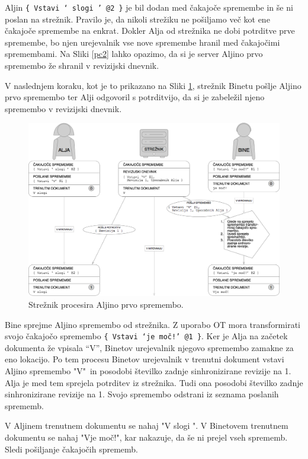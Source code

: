 \documentclass[a4paper, 12pt, twoside]{book}
\begin{document}
Aljin {\tt \{ Vstavi ‘ slogi ’ @2 \}} je bil dodan med čakajoče spremembe in še ni poslan na strežnik. Pravilo je, da nikoli strežiku ne pošiljamo več kot ene čakajoče spremembe na enkrat. Dokler Alja od strežnika ne dobi potrditve prve spremembe, bo njen urejevalnik vse nove spremembe hranil med čakajočimi spremembami. Na Sliki \ref{pc2} lahko opazimo, da si je server Aljino prvo spremembo že shranil v revizijski dnevnik.

\pagebreak

V naslednjem koraku, kot je to prikazano na Sliki \ref{pc3}, strežnik Binetu pošlje Aljino prvo spremembo ter Alji odgovoril s potrditvijo, da si je zabeležil njeno spremembo v revizijski dnevnik.

\begin{figure}[placement h]
\begin{center}
\includegraphics[width=14cm]{pc3.png}
\end{center}
\caption{Strežnik procesira Aljino prvo spremembo.}
\label{pc3}
\end{figure}

Bine sprejme Aljino spremembo od strežnika. Z uporabo OT mora transformirati svojo čakajočo spremembo {\tt \{ Vstavi ‘je moč!’ @1 \}}. Ker je Alja na začetek dokumenta že vpisala “V”, Binetov urejevalnik njegovo spremembo zamakne za eno lokacijo. Po tem procesu Binetov urejevalnik v trenutni dokument vstavi Aljino spremembo "V"\ in posodobi številko zadnje sinhronizirane revizije na 1. Alja je med tem sprejela potrditev iz strežnika. Tudi ona posodobi številko zadnje sinhronizirane revizije na 1. Svojo spremembo odstrani iz seznama poslanih sprememb.

V Aljinem trenutnem dokumentu se nahaj "V slogi ". V Binetovem trenutnem dokumentu se nahaj "Vje moč!", kar nakazuje, da še ni prejel vseh sprememb. Sledi pošiljanje čakajočih sprememb.
\end{document}
